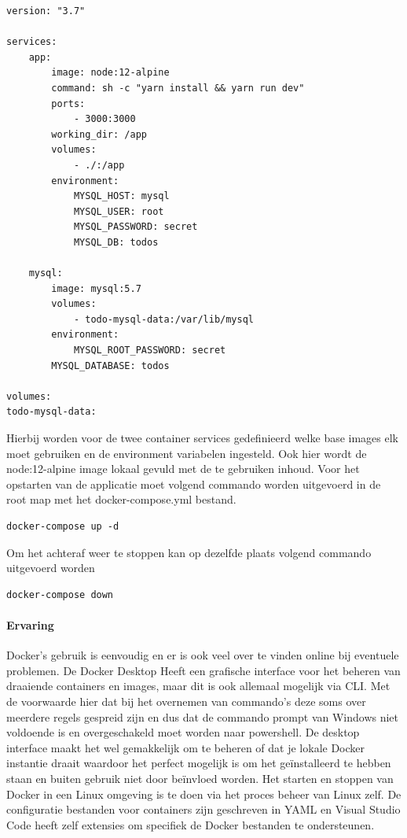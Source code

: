 \begin{lstlisting}[caption=inhoud van de docker-compose.yml,label=lst:Composefile]
version: "3.7"

services:
    app:
        image: node:12-alpine
        command: sh -c "yarn install && yarn run dev"
        ports:
            - 3000:3000
        working_dir: /app
        volumes:
            - ./:/app
        environment:
            MYSQL_HOST: mysql
            MYSQL_USER: root
            MYSQL_PASSWORD: secret
            MYSQL_DB: todos

    mysql:
        image: mysql:5.7
        volumes:
            - todo-mysql-data:/var/lib/mysql
        environment: 
            MYSQL_ROOT_PASSWORD: secret
        MYSQL_DATABASE: todos

volumes:
todo-mysql-data:
\end{lstlisting}
Hierbij worden voor de twee container services gedefinieerd welke base images elk moet gebruiken en de environment variabelen ingesteld. Ook hier wordt de node:12-alpine image lokaal gevuld met de te gebruiken inhoud. Voor het opstarten van de applicatie moet volgend commando worden uitgevoerd in de root map met het docker-compose.yml bestand.
\begin{verbatim}
docker-compose up -d
\end{verbatim}
Om het achteraf weer te stoppen kan op dezelfde plaats volgend commando uitgevoerd worden
\begin{verbatim}
docker-compose down 
\end{verbatim}
\paragraph{Ervaring}
Docker’s gebruik is eenvoudig en er is ook veel over te vinden online bij eventuele problemen. De Docker Desktop Heeft een grafische interface voor het beheren van draaiende containers en images, maar dit is ook allemaal mogelijk via CLI. Met de voorwaarde hier dat bij het overnemen van commando’s deze soms over meerdere regels gespreid zijn en dus dat de commando prompt van Windows niet voldoende is en overgeschakeld moet worden naar powershell.  De desktop interface maakt het wel gemakkelijk om te beheren of dat je lokale Docker instantie draait waardoor het perfect mogelijk is om het geïnstalleerd te hebben staan en buiten gebruik niet door beïnvloed worden. Het starten en stoppen van Docker in een Linux omgeving is te doen via het proces beheer van Linux zelf.  De configuratie bestanden voor containers zijn geschreven in YAML en Visual Studio Code heeft zelf extensies om specifiek de Docker bestanden te ondersteunen.

